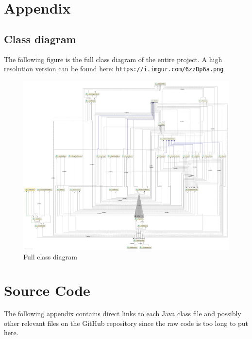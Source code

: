 \documentclass[12p]{article}
\begin{document}
\newpage
\appendix

\section{Appendix}

\subsection{Class diagram} \label{AppendixClassDiagramFull}

The following figure is the full class diagram of the entire project. A high resolution version can be found here: \texttt{https://i.imgur.com/6zzDp6a.png}

\begin{figure}[ht]
  \centering
  \includegraphics[width=1\textwidth]{Documentation/class_diagram}
  \caption{Full class diagram}
  \label{fig:ClassDiagramFull}
\end{figure}


\section{Source Code} \label{SourceCode}

The following appendix contains direct links to each Java class file and possibly other relevant files on the GitHub repository since the raw code is too long to put here.

\newpage
\end{document}
